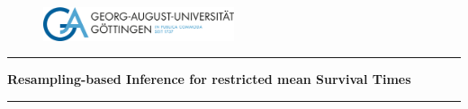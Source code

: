 
\thispagestyle{empty}

\vspace*{\fill}
\begin{center}

\begin{figure}[htbp]
  \centering
  \includegraphics[width=0.5\textwidth]{assets/uni-goe-logo.png}
\end{figure}

\rule{\linewidth}{0.5mm}

{\Large \textbf{Resampling-based Inference for restricted mean Survival Times}}

\rule{\linewidth}{0.5mm} \\

\end{center}

\vspace*{\fill}



\newpage
{}

{
\setcounter{tocdepth}{3}
\tableofcontents
}
